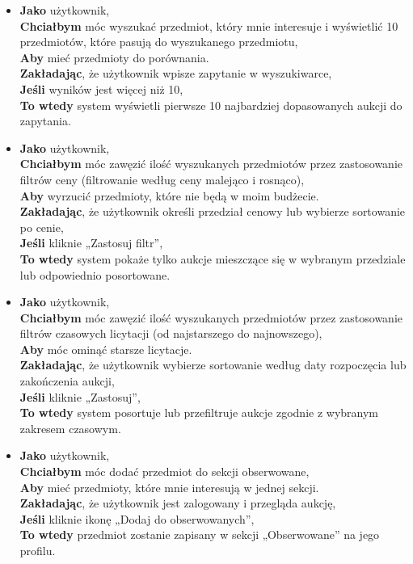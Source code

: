 \begin{itemize}
    \item \textbf{Jako} użytkownik,\\
          \textbf{Chciałbym} móc wyszukać przedmiot, który mnie interesuje i wyświetlić 10 przedmiotów, które pasują do wyszukanego przedmiotu,\\
          \textbf{Aby} mieć przedmioty do porównania.\\
          \textbf{Zakładając}, że użytkownik wpisze zapytanie w wyszukiwarce,\\
          \textbf{Jeśli} wyników jest więcej niż 10,\\
          \textbf{To wtedy} system wyświetli pierwsze 10 najbardziej dopasowanych aukcji do zapytania.\\
    \item \textbf{Jako} użytkownik,\\
          \textbf{Chciałbym} móc zawęzić ilość wyszukanych przedmiotów przez zastosowanie filtrów ceny (filtrowanie według ceny malejąco i rosnąco),\\
          \textbf{Aby} wyrzucić przedmioty, które nie będą w moim budżecie. \\
          \textbf{Zakładając}, że użytkownik określi przedział cenowy lub wybierze sortowanie po cenie,\\
          \textbf{Jeśli} kliknie „Zastosuj filtr”,\\
          \textbf{To wtedy} system pokaże tylko aukcje mieszczące się w wybranym przedziale lub odpowiednio posortowane.\\
    \item \textbf{Jako} użytkownik,\\
          \textbf{Chciałbym} móc zawęzić ilość wyszukanych przedmiotów przez zastosowanie filtrów czasowych licytacji (od najstarszego do najnowszego), \\
          \textbf{Aby} móc ominąć starsze licytacje.\\
          \textbf{Zakładając}, że użytkownik wybierze sortowanie według daty rozpoczęcia lub zakończenia aukcji,\\
          \textbf{Jeśli} kliknie „Zastosuj”,\\
          \textbf{To wtedy} system posortuje lub przefiltruje aukcje zgodnie z wybranym zakresem czasowym.\\
    \item \textbf{Jako} użytkownik,\\
          \textbf{Chciałbym} móc dodać przedmiot do sekcji obserwowane,\\
          \textbf{Aby} mieć przedmioty, które mnie interesują w jednej sekcji.\\
          \textbf{Zakładając}, że użytkownik jest zalogowany i przegląda aukcję,\\
          \textbf{Jeśli} kliknie ikonę „Dodaj do obserwowanych”,\\
          \textbf{To wtedy} przedmiot zostanie zapisany w sekcji „Obserwowane” na jego profilu.\\


\end{itemize}
